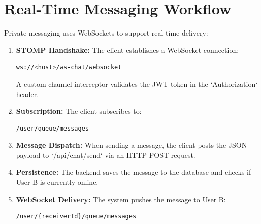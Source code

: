 \section{Real-Time Messaging Workflow}
Private messaging uses WebSockets to support real-time delivery:
\begin{enumerate}
    \item \textbf{STOMP Handshake:} The client establishes a WebSocket connection:
    \begin{lstlisting}[language=bash]
    ws://<host>/ws-chat/websocket
    \end{lstlisting}
    A custom channel interceptor validates the JWT token in the `Authorization` header.
    \item \textbf{Subscription:} The client subscribes to:
    \begin{lstlisting}[language=bash]
    /user/queue/messages
    \end{lstlisting}
    \item \textbf{Message Dispatch:} When sending a message, the client posts the JSON payload to `/api/chat/send` via an HTTP POST request.
    \item \textbf{Persistence:} The backend saves the message to the database and checks if User B is currently online.
    \item \textbf{WebSocket Delivery:} The system pushes the message to User B:
    \begin{lstlisting}[language=bash]
    /user/{receiverId}/queue/messages
    \end{lstlisting}
\end{enumerate}
